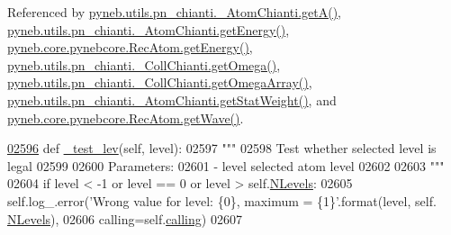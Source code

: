Referenced by \hyperlink{pn__chianti_8py_source_l00296}{pyneb.\+utils.\+pn\+\_\+chianti.\+\_\+\+Atom\+Chianti.\+get\+A()}, \hyperlink{pn__chianti_8py_source_l00346}{pyneb.\+utils.\+pn\+\_\+chianti.\+\_\+\+Atom\+Chianti.\+get\+Energy()}, \hyperlink{pynebcore_8py_source_l02811}{pyneb.\+core.\+pynebcore.\+Rec\+Atom.\+get\+Energy()}, \hyperlink{pn__chianti_8py_source_l00484}{pyneb.\+utils.\+pn\+\_\+chianti.\+\_\+\+Coll\+Chianti.\+get\+Omega()}, \hyperlink{pn__chianti_8py_source_l00461}{pyneb.\+utils.\+pn\+\_\+chianti.\+\_\+\+Coll\+Chianti.\+get\+Omega\+Array()}, \hyperlink{pn__chianti_8py_source_l00323}{pyneb.\+utils.\+pn\+\_\+chianti.\+\_\+\+Atom\+Chianti.\+get\+Stat\+Weight()}, and \hyperlink{pynebcore_8py_source_l02623}{pyneb.\+core.\+pynebcore.\+Rec\+Atom.\+get\+Wave()}.


\begin{DoxyCode}
\hypertarget{classpyneb_1_1core_1_1pynebcore_1_1_rec_atom_l02596}{}\hyperlink{classpyneb_1_1core_1_1pynebcore_1_1_rec_atom_a271f5e8992df0412c6fdca611ac87a5d}{02596}     \textcolor{keyword}{def }\hyperlink{classpyneb_1_1core_1_1pynebcore_1_1_rec_atom_a271f5e8992df0412c6fdca611ac87a5d}{\_test\_lev}(self, level):
02597         \textcolor{stringliteral}{"""}
02598 \textcolor{stringliteral}{        Test whether selected level is legal}
02599 \textcolor{stringliteral}{}
02600 \textcolor{stringliteral}{        Parameters:}
02601 \textcolor{stringliteral}{            - level        selected atom level}
02602 \textcolor{stringliteral}{}
02603 \textcolor{stringliteral}{        """}       
02604         \textcolor{keywordflow}{if} level < -1 \textcolor{keywordflow}{or} level == 0 \textcolor{keywordflow}{or} level > self.\hyperlink{classpyneb_1_1core_1_1pynebcore_1_1_rec_atom_a37c93c0fbaad583a1019f5930bc51999}{NLevels}:
02605             self.log\_.error(\textcolor{stringliteral}{'Wrong value for level: \{0\}, maximum = \{1\}'}.format(level, self.
      \hyperlink{classpyneb_1_1core_1_1pynebcore_1_1_rec_atom_a37c93c0fbaad583a1019f5930bc51999}{NLevels}),
02606                             calling=self.\hyperlink{classpyneb_1_1core_1_1pynebcore_1_1_rec_atom_a82ec425ebba32b73a5d9ae52717d47c4}{calling})
02607 
\end{DoxyCode}
\hypertarget{classpyneb_1_1core_1_1pynebcore_1_1_rec_atom_a32b31a371f3b6ecc5bbbc4d0c5d2a855}{}
